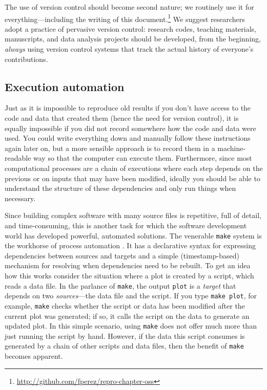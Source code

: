 \documentclass[11pt,oneside,english]{article}
\begin{document}
The use of version control should become second nature; we
routinely use it for everything---including the writing of this
document.\footnote{\url{http://github.com/fperez/repro-chapter-oss}}  We
suggest researchers adopt a practice of pervasive version control: research
codes, teaching materials, manuscripts, and data analysis projects should be
developed, from the beginning, \emph{always} using version control systems that
track the actual history of everyone's contributions.

\subsection{Execution automation}

Just as it is impossible to reproduce old results if you don't have access to
the code and data that created them (hence the need for version control), it is
equally impossible if you did not record somewhere how the code and data were
used.  You could write everything down and manually follow these instructions
again later on, but a more sensible approach is to record them in a
machine-readable way so that the computer can execute them.  Furthermore, since
most computational processes are a chain of executions where each step depends
on the previous or on inputs that may have been modified, ideally you should be
able to understand the structure of these dependencies and only run things when
necessary.

Since building complex software with many source files is repetitive, full of
detail, and time-consuming, this is another task for which the software
development world has developed powerful, automated solutions.  The venerable
\texttt{make} system is the workhorse of process automation \cite{make:2004}.
It has a declarative syntax for expressing dependencies between sources and
targets and a simple (timestamp-based) mechanism for resolving when
dependencies need to be rebuilt.  To get an idea how this works consider the
situation where a plot is created by a script, which reads a data file. In the
parlance of \texttt{make}, the output \texttt{plot} is a \emph{target} that
depends on two \emph{sources}---the data file and the script. If you type
\texttt{make plot}, for example, \texttt{make} checks whether the script or
data has been modified after the current plot was generated; if so, it calls
the script on the data to generate an updated plot. In this simple scenario,
using \texttt{make} does not offer much more than just running the script by
hand.  However, if the data this script consumes is generated by a chain of
other scripts and data files, then the benefit of \texttt{make} becomes
apparent.
\end{document}
